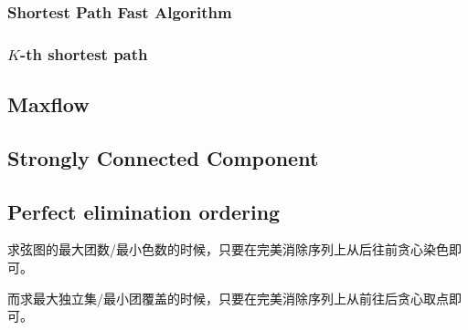 \subsubsection{Shortest Path Fast Algorithm}

\subsubsection{$K$-th shortest path}


\subsection{Maxflow}


\subsection{Strongly Connected Component}


\subsection{Perfect elimination ordering}
求弦图的最大团数/最小色数的时候，只要在完美消除序列上从后往前贪心染色即可。
 
而求最大独立集/最小团覆盖的时候，只要在完美消除序列上从前往后贪心取点即可。

